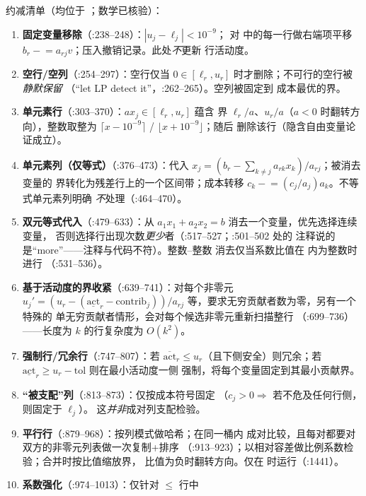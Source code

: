 \documentclass[11pt]{ctexart}
\begin{document}
约减清单（均位于 ；数学已核验）：
\begin{enumerate}[nosep]
\item \textbf{固定变量移除}（:238--248）：$|u_j-\ell_j|<10^{-9}$；
  对  中的每一行做右端项平移
  $b_r \mathrel{-}= a_{rj} v$；压入撤销记录。此处\emph{不}更新
  行活动度。
\item \textbf{空行/空列}（:254--297）：空行仅当
  $0\in[\ell_r, u_r]$ 时才删除；不可行的空行被\emph{静默保留}
  （“let LP detect it”，:262--265）。空列被固定到
  成本最优的界。
\item \textbf{单元素行}（:303--370）：$a x_j \in [\ell_r,u_r]$ 蕴含
  界 $\ell_r/a$、$u_r/a$（$a<0$ 时翻转方向），整数取整为
  $\lceil x - 10^{-9}\rceil$ / $\lfloor x + 10^{-9}\rfloor$；随后
  删除该行（隐含自由变量论证成立）。
\item \textbf{单元素列（仅等式）}（:376--473）：代入
  $x_j = (b_r - \sum_{k\ne j} a_{rk} x_k)/a_{rj}$；被消去变量的
  界转化为残差行上的一个区间带；成本转移
  $c_k \mathrel{-}= (c_j/a_j) a_k$。不等式单元素列明确
  \emph{不}处理（:464--470）。
\item \textbf{双元等式代入}（:479--633）：从
  $a_1 x_1 + a_2 x_2 = b$ 消去一个变量，优先选择连续变量，
  否则选择行出现次数\emph{更少}者（:517--527；:501--502 处的
  注释说的是“more”——注释与代码不符）。整数--整数
  消去仅当系数比值在  内为整数时进行
  （:531--536）。
\item \textbf{基于活动度的界收紧}（:639--741）：对每个非零元
  $u_j' = (u_r - (\underline{\mathrm{act}}_r - \mathrm{contrib}_j))/a_{rj}$
  等，要求无穷贡献者数为零，另有一个特殊的
  单无穷贡献者情形，会对每个候选非零元重新扫描整行
  （:699--736）——长度为 $k$ 的行复杂度为 $O(k^2)$。
\item \textbf{强制行/冗余行}（:747--807）：若
  $\overline{\mathrm{act}}_r \le u_r$（且下侧安全）则冗余；若
  $\underline{\mathrm{act}}_r \ge u_r - \mathrm{tol}$ 则在最小活动度一侧
  强制，将每个变量固定到其最小贡献界。
\item \textbf{“被支配”列}（:813--873）：仅按成本符号固定
  （$c_j>0 \Rightarrow$ 若不危及任何行侧，则固定于 $\ell_j$）。
  这\emph{并非}成对列支配检验。
\item \textbf{平行行}（:879--968）：按列模式做哈希；在同一桶内
  成对比较，且每对都要对双方的非零元列表做一次复制+排序
  （:913--923）；以相对容差做比例系数检验；合并时按比值缩放界，
  比值为负时翻转方向。仅在
   时运行（:1441）。
\item \textbf{系数强化}（:974--1013）：仅针对 $\le$ 行中

\end{enumerate}
\end{document}
